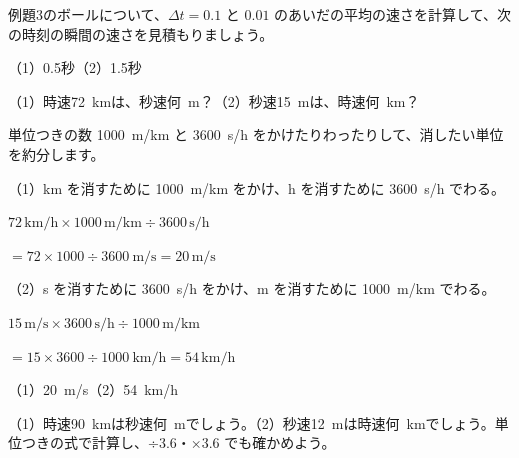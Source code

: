 \begin{jibun}
例題3のボールについて、$\Delta t=0.1$ と $0.01$ のあいだの平均の速さを計算して、次の時刻の瞬間の速さを見積もりましょう。\par
（1）0.5秒\quad（2）1.5秒
\end{jibun}

\begin{reidai}[時速と秒速をなおす]
（1）時速\qty{72}{km}は、秒速\mbox{何 m}？\quad（2）秒速\qty{15}{m}は、時速\mbox{何 km}？\par
\kangaekata 単位つきの数 \qty{1000}{m/km} と \qty{3600}{s/h} をかけたりわったりして、消したい単位を約分します。\par
\shiki（1）km を消すために \qty{1000}{m/km} をかけ、h を消すために \qty{3600}{s/h} でわる。\par
\hspace*{4.3\zw}$72\,\mathrm{km/h}\times1000\,\mathrm{m/km}\div3600\,\mathrm{s/h}$\par
\hspace*{4.3\zw}$=72\times1000\div3600\ \mathrm{m/s}=20\,\mathrm{m/s}$\par
\hspace*{2.6\zw}（2）s を消すために \qty{3600}{s/h} をかけ、m を消すために \qty{1000}{m/km} でわる。\par
\hspace*{4.3\zw}$15\,\mathrm{m/s}\times3600\,\mathrm{s/h}\div1000\,\mathrm{m/km}$\par
\hspace*{4.3\zw}$=15\times3600\div1000\ \mathrm{km/h}=54\,\mathrm{km/h}$\par
\kotae （1）\qty{20}{m/s}\quad（2）\qty{54}{km/h}
\end{reidai}

\begin{jibun}
（1）時速\qty{90}{km}は秒速\mbox{何 m}でしょう。\quad（2）秒速\qty{12}{m}は時速\mbox{何 km}でしょう。単位つきの式で計算し、÷3.6・×3.6 でも確かめよう。
\end{jibun}

